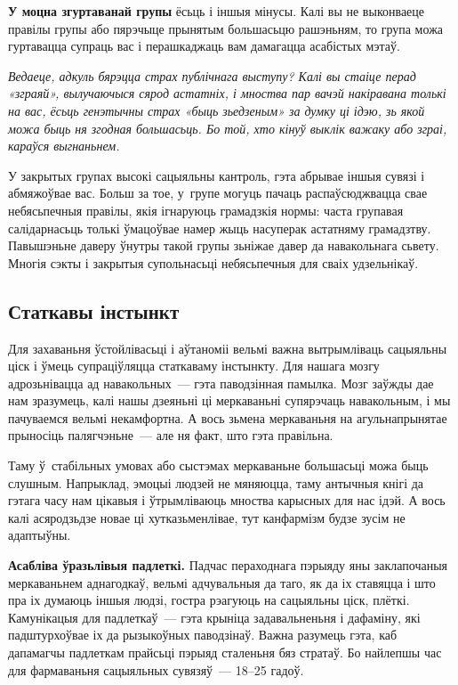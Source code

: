 \textbf{У моцна згуртаванай групы} ёсьць і іншыя мінусы. Калі вы не выконваеце правілы групы або пярэчыце прынятым большасьцю рашэньням, то група можа гуртавацца супраць вас і перашкаджаць вам дамагацца асабістых мэтаў.

\emph{Ведаеце, адкуль бярэцца страх публічнага выступу? Калі вы стаіце перад «зграяй», вылучаючыся сярод астатніх, і мноства пар вачэй накіравана толькі на вас, ёсьць генэтычны страх «быць зьедзеным» за думку ці ідэю, зь якой можа быць ня згодная большасьць. Бо той, хто кінуў выклік важаку або зграі, караўся выгнаньнем.}

У закрытых групах высокі сацыяльны кантроль, гэта абрывае іншыя сувязі і абмяжоўвае вас. Больш за тое, у~групе могуць пачаць распаўсюджвацца свае небясьпечныя правілы, якія ігнаруюць грамадзкія нормы: часта групавая салідарнасьць толькі ўмацоўвае намер жыць насуперак астатняму грамадзтву. Павышэньне даверу ўнутры такой групы зьніжае давер да навакольнага сьвету. Многія сэкты і закрытыя супольнасьці небясьпечныя для сваіх удзельнікаў.

\subsection*{Статкавы інстынкт}

Для захаваньня ўстойлівасьці і аўтаноміі вельмі важна вытрымліваць сацыяльны ціск і ўмець супраціўляцца статкаваму інстынкту. Для нашага мозгу адрозьнівацца ад навакольных~--- гэта паводзінная памылка. Мозг заўжды дае нам зразумець, калі нашы дзеяньні ці меркаваньні супярэчаць навакольным, і мы пачуваемся вельмі некамфортна. А вось зьмена меркаваньня на агульнапрынятае прыносіць палягчэньне~--- але ня факт, што гэта правільна.


Таму ў~стабільных умовах або сыстэмах меркаваньне большасьці можа быць слушным. Напрыклад, эмоцыі людзей не мяняюцца, таму антычныя кнігі да гэтага часу нам цікавыя і ўтрымліваюць мноства карысных для нас ідэй. А вось калі асяродзьдзе новае ці хутказьменлівае, тут канфармізм будзе зусім не адаптыўны.

\textbf{Асабліва ўразьлівыя падлеткі.} Падчас пераходнага пэрыяду яны заклапочаныя меркаваньнем аднагодкаў, вельмі адчувальныя да таго, як да іх ставяцца і што пра іх думаюць іншыя людзі, гостра рэагуюць на сацыяльны ціск, плёткі. Камунікацыя для падлеткаў~--- гэта крыніца задавальненьня і дафаміну, які падштурхоўвае іх да рызыкоўных паводзінаў. Важна разумець гэта, каб дапамагчы падлеткам прайсьці пэрыяд сталеньня бяз стратаў. Бо найлепшы час для фармаваньня сацыяльных сувязяў~--- 18--25 гадоў.

